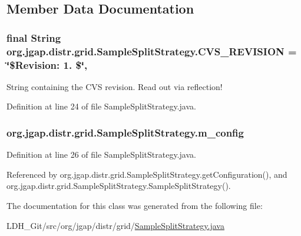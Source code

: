 \subsection{Member Data Documentation}
\hypertarget{classorg_1_1jgap_1_1distr_1_1grid_1_1_sample_split_strategy_ac8e2a8dfa62d18a1437cd9c05fa67269}{
\subsubsection[{C\-V\-S\-\_\-\-R\-E\-V\-I\-S\-I\-O\-N}]{\setlength{\rightskip}{0pt plus 5cm}final String org.\-jgap.\-distr.\-grid.\-Sample\-Split\-Strategy.\-C\-V\-S\-\_\-\-R\-E\-V\-I\-S\-I\-O\-N = \char`\"{}\$Revision\-: 1. \$\char`\"{}\hspace{0.3cm}{\ttfamily [static]}, {\ttfamily [private]}}}\label{classorg_1_1jgap_1_1distr_1_1grid_1_1_sample_split_strategy_ac8e2a8dfa62d18a1437cd9c05fa67269}
String containing the C\-V\-S revision. Read out via reflection! 

Definition at line 24 of file Sample\-Split\-Strategy.\-java.

\hypertarget{classorg_1_1jgap_1_1distr_1_1grid_1_1_sample_split_strategy_a8b525351206053287f004894a174c54f}{
\subsubsection[{m\-\_\-config}]{ org.\-jgap.\-distr.\-grid.\-Sample\-Split\-Strategy.\-m\-\_\-config\hspace{0.3cm}{\ttfamily [private]}}}\label{classorg_1_1jgap_1_1distr_1_1grid_1_1_sample_split_strategy_a8b525351206053287f004894a174c54f}


Definition at line 26 of file Sample\-Split\-Strategy.\-java.



Referenced by org.\-jgap.\-distr.\-grid.\-Sample\-Split\-Strategy.\-get\-Configuration(), and org.\-jgap.\-distr.\-grid.\-Sample\-Split\-Strategy.\-Sample\-Split\-Strategy().



The documentation for this class was generated from the following file\-:\begin{DoxyCompactItemize}
\item 
L\-D\-H\-\_\-\-Git/src/org/jgap/distr/grid/\hyperlink{_sample_split_strategy_8java}{Sample\-Split\-Strategy.\-java}\end{DoxyCompactItemize}
